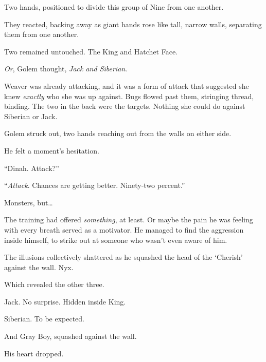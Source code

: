 Two hands, positioned to divide this group of Nine from one another.



They reacted, backing away as giant hands rose like tall, narrow walls, separating them from one another.



Two remained untouched.  The King and Hatchet Face.



\emph{Or}, Golem thought, \emph{Jack and Siberian}.



Weaver was already attacking, and it was a form of attack that suggested she knew \emph{exactly} who she was up against.  Bugs flowed past them, stringing thread, binding.  The two in the back were the targets.  Nothing she could do against Siberian or Jack.



Golem struck out, two hands reaching out from the walls on either side.



He felt a moment's hesitation.



``Dinah.  Attack?''



``\emph{Attack}.  Chances are getting better.  Ninety-two percent.''



Monsters, but\ldots



The training had offered \emph{something}, at least.  Or maybe the pain he was feeling with every breath served as a motivator.  He managed to find the aggression inside himself, to strike out at someone who wasn't even aware of him.



The illusions collectively shattered as he squashed the head of the `Cherish' against the wall.  Nyx.



Which revealed the other three.



Jack.  No surprise.  Hidden inside King.



Siberian.  To be expected.



And Gray Boy, squashed against the wall.



His heart dropped.



